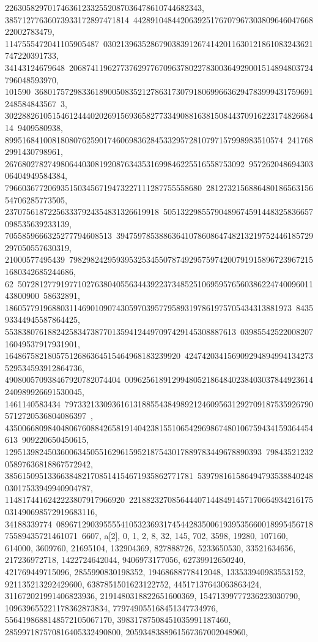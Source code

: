 {{{2263058297017463612332552087036478610744682343, 38571277636073933172897471814\
44289104844206392517670796730380964604766822002783479, 1147555472041105905487\
0302139635286790383912674142011630121861083243621747220391733, 34143124679648\
206874119627737629776709637802278300364929001514894803724796048593970, 101590\
36801757298336189005083521278631730791806996636294783999431759691248584843567\
3, 30228826105154612444020269156936582773349088163815084437091622317482668414\
9409580938, 89951684100818080762590174606983628453329572810797157998983510574\
2417682991430798961, 26768027827498064403081920876343531699846225516558753092\
95726204869430306404949584384, 7966036772069351503456719473227111287755558680\
281273215688648018656315654706285773505, 237075618722563337924354831326619918\
50513229855790489674591448325836657098535639233139, 7055859666325277794608513\
3947597853886364107860864748213219752446185729297050557630319, 21000577495439\
7982982429593953253455078749295759742007919158967239672151680342685244686, 62\
50728127791977102763804055634439223734852510695957656038622474009601143800900\
58632891, 1860577919688031146901090743059703957795893197861975705434313881973\
843593344945587864425, 553838076188242583473877013594124497097429145308887613\
0398554252200820716049537917931901, 16486758218057512686364515464968183239920\
424742034156909294894994134273529534593912864736, 490800570938467920782074404\
00962561891299480521864840238403037844923614240989926691530045, 1461140583434\
79733213309361613188554384989212460956312927091875359267905712720536804086397\
, 435006680984048067608842658191404238155106542969867480106759434159364454613\
909220650450615, 129513982450360063450551629615952187543017889783449678890393\
7984352123205897636818867572942, 38561509513366384821708514154671935862771781\
53979816158649479353884024803017533949940904787, 1148174416242223807917966920\
2218823270856444071448491457170664934216175031490698572919683116, 34188339774\
08967129039555541053236931745442835006193953566001899545671875589435721461071\
6607}}, {a[2], {0, 1, 2, 8, 32, 145, 702, 3598, 19280, 107160, 614000, 
   3609760, 21695104, 132904369, 827888726, 5233650530, 33521634656, 
   217236972718, 1422724642044, 9406973177056, 62739912650240, 
   421769449715096, 2855990830198352, 19468688778412048, 133533940983553152, 
   921135213292429600, 6387851501623122752, 44517137643063863424, 
   311672021991406823936, 2191480318822651600369, 15471399777236223030790, 
   109639655221178362873834, 779749055168451347734976, 
   5564198688148572105067170, 39831787508451035991187460, 
   285997187570816405332490800, 2059348388961567367002048960, 
}}}
